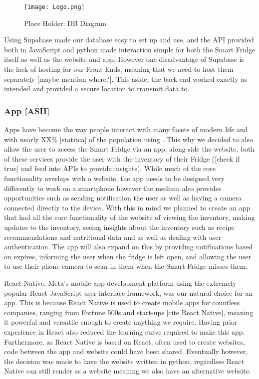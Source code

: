 \begin{figure}[H]        
    \centering
    \texttt{[image: Logo.png]}
    \caption{Place Holder: DB Diagram}
    \label{fig:placeholder}
\end{figure} 


Using Supabase made our database easy to set up and use, and the API provided both in JavaScript and python made interaction simple for both the Smart Fridge itself as well as the website and app.
However one disadvantage of Supabase is the lack of hosting for our Front Ends, meaning that we need to host them separately [maybe mention where?].
This aside, the back end worked exactly as intended and provided a secure location to transmit data to.

\subsubsection{App [ASH]}

Apps have become the way people interact with many facets of modern life and with nearly XX\% [statitca] of the population using .
This why we decided to also allow the user to access the Smart Fridge via an app, along side the website, both of these services provide the user with the inventory of their Fridge ([check if true] and feed into APIs to provide insights).
While much of the core functionality overlaps with a website, the app needs to be designed very differently to work on a smartphone however the medium also provides opportunities such as sending notification the user as well as having a camera connected directly to the device.
With this in mind we planned to create an app that had all the core functionality of the website of viewing the inventory, making updates to the inventory, seeing insights about the inventory such as recipe recommendations and nutritional data and as well as dealing with user authentication.
The app will also expand on this by providing notifications based on expires, informing the user when the fridge is left open, and allowing the user to use their phone camera to scan in them when the Smart Fridge misses them.

React Native, Meta's mobile app development platform using the extremely popular React JavaScript user interface framework, was our natural choice for an app.
This is because React Native is used to create mobile apps for countless companies, ranging from Fortune 500s and start-ups [cite React Native], meaning it powerful and versatile enough to create anything we require.
Having prior experience in React also reduced the learning curve required to make this app.
Furthermore, as React Native is based on React, often used to create websites, code between the app and website could have been shared.
Eventually however, the decision was made to have the website written in python, regardless React Native can still render as a website meaning we also have an alternative website.

